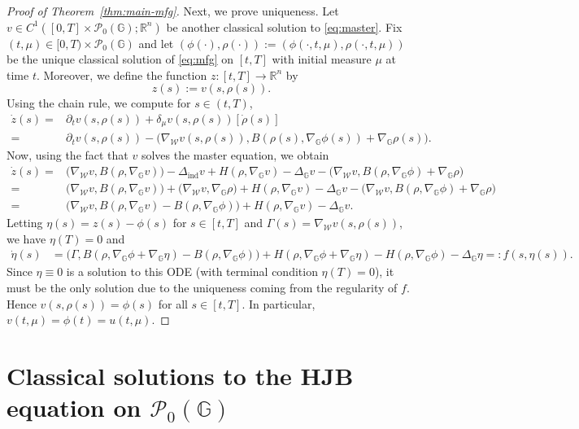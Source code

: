 \documentclass[10pt]{article}
\numberwithin{equation}{section}
\newcommand{\cP}{ \mathcal{P}}
\newcommand{\cW}{ \mathcal{W}}
\newcommand{\R}{\mathbb R}
\def\R{{\mathbb{R}}}
\def\G{\mathbb{G}}
\begin{document}
\begin{proof}[Proof of Theorem~\ref{thm:main-mfg}]
Next, we prove uniqueness. Let $v \in C^1([0,T] \times \cP_0(\G); \R^n)$ be another classical solution to \eqref{eq:master}. Fix $(t, \mu) \in [0,T) \times \cP_0(\G)$ and let $(\phi(\cdot), \rho(\cdot)):=(\phi(\cdot,t,\mu),\rho(\cdot,t,\mu))$ be the unique classical solution of \eqref{eq:mfg} on $[t,T]$ with initial measure $\mu$ at time $t$.
Moreover, we define the function $z:[t,T] \to \R^n$ by
\[z(s):=v(s, \rho(s)).\]
Using the chain rule, we compute for $s \in (t,T)$,
\begin{align*}
\dot z(s)= &\partial_t v(s, \rho(s)) +  \delta_\mu v (s, \rho(s))[\dot \rho(s)]\\
= &\partial_t v(s, \rho(s)) - \big( \nabla_\cW v(s, \rho(s)), B(\rho(s),\nabla_{\G}\phi(s))+\nabla_{\G}\rho(s) \big).
\end{align*}
Now, using the fact that $v$ solves the master equation, we obtain
\begin{align*}
\dot z(s) =& \big(\nabla_\cW v, B(\rho, \nabla_\G v)\big) - \Delta_{\text{ind}} v + H(\rho, \nabla_\G v) - \Delta_\G v - \big(\nabla_\cW v, B(\rho, \nabla_\G\phi) + \nabla_\G\rho\big)\\
= & \big(\nabla_\cW v, B(\rho, \nabla_\G v)\big) + \big(\nabla_\cW v, \nabla_\G\rho\big) + H(\rho, \nabla_\G v) - \Delta_\G v - \big(\nabla_\cW v, B(\rho, \nabla_\G\phi) + \nabla_\G\rho\big)\\
= & \big(\nabla_\cW v, B(\rho, \nabla_\G v) - B(\rho, \nabla_\G\phi)\big) + H(\rho, \nabla_\G v) - \Delta_\G v.
\end{align*}
Letting $\eta(s)=z(s)-\phi(s)$ for $s \in [t,T]$ and $\Gamma(s)=\nabla_{\cW}v(s, \rho(s))$, we have $\eta(T)=0$ and
\begin{align*}
\dot \eta(s) &= \big(\Gamma, B(\rho, \nabla_\G\phi + \nabla_\G\eta) - B(\rho, \nabla_\G\phi)\big) + H(\rho, \nabla_\G\phi + \nabla_\G\eta) - H(\rho, \nabla_\G\phi) - \Delta_\G\eta=: f(s, \eta(s)).
\end{align*}
Since $\eta \equiv 0$ is a solution to this ODE (with terminal condition $\eta(T) = 0$), it must be the only solution due to the uniqueness coming from the regularity of $f$. Hence $v(s, \rho(s)) = \phi(s)$ for all $s \in [t,T]$. In particular, $v(t, \mu) = \phi(t) = u(t, \mu)$.
\end{proof}
%
%
%
%
\section{Classical solutions to the HJB equation on \texorpdfstring{$\cP_0(\G)$}{P\_0(G)}}\label{sec:ClassicalHJE}
%
\end{document}
